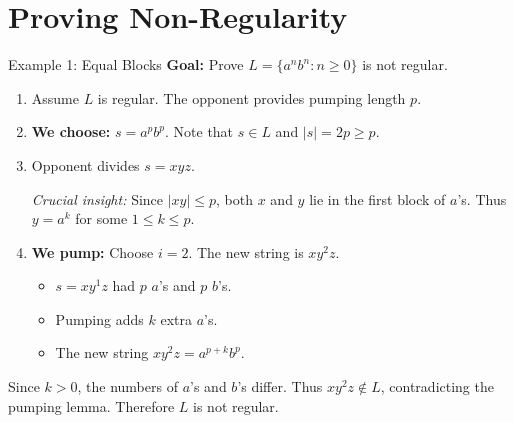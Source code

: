 \documentclass[10pt]{beamer}
\begin{document}
\section{Proving Non-Regularity}

\begin{frame}{Example 1: Equal Blocks}
  \small
  \textbf{Goal:} Prove
  $L=\{a^n b^n:n\geq0\}$ is not regular.
  \pause
  
  \begin{enumerate}
      \item Assume $L$ is regular. The opponent provides pumping length $p$.
      \pause
      \item \textbf{We choose:} $s = a^p b^p$. Note that $s \in L$ and $|s| = 2p \geq p$.
      \pause
      \item Opponent divides $s=xyz$.

      \textit{Crucial insight:} Since $|xy|\leq p$, both $x$ and $y$ lie in
      the first block of $a$'s. Thus $y=a^k$ for some $1\leq k\leq p$.
      \pause
      \item \textbf{We pump:} Choose $i = 2$. The new string is $xy^2z$.
      \begin{itemize}
          \item $s = xy^1z$ had $p$ $a$'s and $p$ $b$'s.
          \item Pumping adds $k$ extra $a$'s.
          \item The new string $xy^2z = a^{p+k} b^p$.
      \end{itemize}
  \end{enumerate}
  \pause
  Since $k>0$, the numbers of $a$'s and $b$'s differ. Thus
  $xy^2z\notin L$, contradicting the pumping lemma. Therefore $L$ is not
  regular.
\end{frame}
\end{document}
